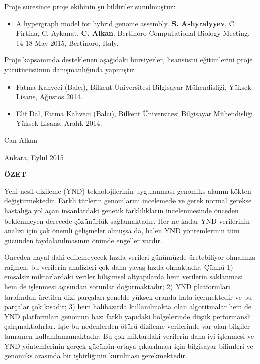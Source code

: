 \documentclass[11pt]{article}
\begin{document}
Proje süresince proje ekibinin şu bildiriler sunulmuştur:
 
\begin{itemize}
\item A hypergraph model for hybrid genome assembly. {\bf S. Ashyralyyev}, C. Firtina, C. Aykanat, {\bf C. Alkan}. Bertinoro Computational Biology Meeting, 14-18 May 2015, Bertinoro, Italy.

\end{itemize}

Proje kapsamında desteklenen aşağıdaki bursiyerler,  lisansüstü eğitimlerini 
proje yürütücüsünün danışmanlığında
yapmıştır.
 
\begin{itemize}
\item Fatma Kahveci (Balcı), Bilkent Üniversitesi Bilgisayar Mühendisliği, Yüksek Lisans, Ağustos 2014.
\item Elif Dal, Fatma Kahveci (Balcı), Bilkent Üniversitesi Bilgisayar Mühendisliği, Yüksek Lisans, Aralık 2014.
\end{itemize}


\bigskip
\hfill Can Alkan

\hfill Ankara, Eylül 2015
\newpage

\setlength{\parskip}{1mm} 

\tableofcontents
\listoffigures
\listoftables



\newpage \setlength{\parskip}{3mm}
\phantom{ss}
\vspace{-2.5cm}

\begin{center}
{\bf \Large ÖZET} 
\end{center}
\noindent

Yeni nesil dizileme (YND) teknolojilerinin uygulanması genomiks alanını kökten değiştirmektedir. Farklı türlerin genomlarını incelemede ve gerek normal gerekse hastalığa yol açan insanlardaki genetik farklılıkların incelenmesinde önceden beklenmeyen derecede çözünürlük sağlamaktadır. Her ne kadar YND verilerinin analizi için çok önemli gelişmeler olmuşsa da, halen YND yöntemlerinin tüm gücünden faydalanılmasının önünde engeller vardır.

Önceden hayal dahi edilemeyecek hızda verileri günümüzde üretebiliyor olmamıza rağmen, bu verilerin analizleri çok daha yavaş hızda olmaktadır. Çünkü 1) emsalsiz miktarlardaki veriler bilişimsel altyapılarda hem verilerin saklanması hem de işlenmesi açısından sorunlar doğurmaktadır; 2) YND platformları tarafından üretilen dizi parçaları genelde yüksek oranda hata içermektedir ve bu parçalar çok kısadır; 3) hem halihazırda kullanılmakta olan algoritmalar hem de YND platformları genomun bazı farklı yapıdaki bölgelerinde düşük performanslı çalışmaktadırlar. İşte bu nedenlerden ötürü dizileme verilerinde var olan bilgiler tamamen kullanılamamaktadır. Bu çok miktardaki verilerin daha iyi işlenmesi ve YND yöntemlerinin gerçek gücünün ortaya çıkarılması için bilgisayar bilimleri ve genomiks arasında bir işbirliğinin kurulması gerekmektedir.
\end{document}
